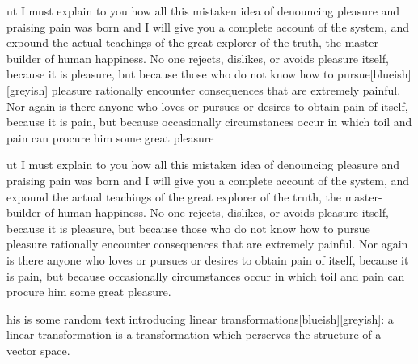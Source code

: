 \documentclass[10pt]{article}
\def\sidenotepi#1\par%
\begin{document}
\sidenotepi
But I must explain to you how all this mistaken idea of denouncing pleasure and praising pain was born and I will give you a complete account of the system, and expound the actual teachings of the great explorer of the truth, the master-builder of human happiness. No one rejects, dislikes, or avoids pleasure itself, because it is pleasure, but because those who do not know how to pursue[blueish][greyish] pleasure rationally encounter consequences that are extremely painful. Nor again is there anyone who loves or pursues or desires to obtain pain of itself, because it is pain, but because occasionally circumstances occur in which toil and pain can procure him some great pleasure


\sidenotepi
But I must explain to you how all this mistaken idea of denouncing pleasure and praising pain was born and I will give you a complete account of the system, and expound the actual teachings of the great explorer of the truth, the master-builder of human happiness. No one rejects, dislikes, or avoids pleasure itself, because it is pleasure, but because those who do not know how to pursue pleasure rationally encounter consequences that are extremely painful. Nor again is there anyone who loves or pursues or desires to obtain pain of itself, because it is pain, but because occasionally circumstances occur in which toil and pain can procure him some great pleasure.


\sidenotepi
This is some random text introducing linear transformations[blueish][greyish]: a linear transformation is a transformation which perserves the structure of a vector space.

\blindtext[2]
\end{document}
